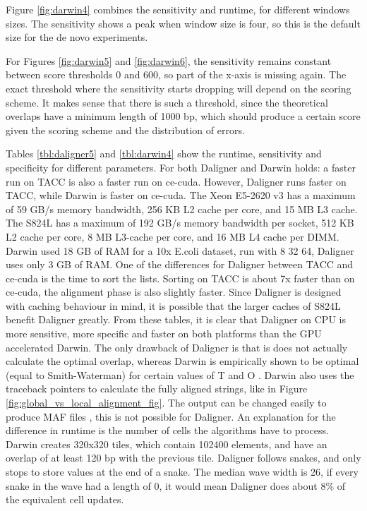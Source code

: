\documentclass[../thesis.tex]{subfiles}
\begin{document}
Figure \ref{fig:darwin4} combines the sensitivity and runtime, for different windows sizes.
The sensitivity shows a peak when window size is four, so this is the default size for the de novo experiments.

For Figures \ref{fig:darwin5} and \ref{fig:darwin6}, the sensitivity remains constant between score thresholds 0 and 600, so part of the x-axis is missing again.
The exact threshold where the sensitivity starts dropping will depend on the scoring scheme.
It makes sense that there is such a threshold, since the theoretical overlaps have a minimum length of 1000 bp, which should produce a certain score given the scoring scheme and the distribution of errors.

Tables \ref{tbl:daligner5} and \ref{tbl:darwin4} show the runtime, sensitivity and specificity for different parameters.
For both Daligner and Darwin holds: a faster run on TACC is also a faster run on ce-cuda.
However, Daligner runs faster on TACC, while Darwin is faster on ce-cuda.
The Xeon E5-2620 v3 has a maximum of 59 GB/s memory bandwidth, 256 KB L2 cache per core, and 15 MB L3 cache.
The S824L has a maximum of 192 GB/s memory bandwidth per socket, 512 KB L2 cache per core, 8 MB L3-cache per core, and 16 MB L4 cache per DIMM.
Darwin used 18 GB of RAM for a 10x E.coli dataset, run with 8 32 64, Daligner uses only 3 GB of RAM.
One of the differences for Daligner between TACC and ce-cuda is the time to sort the lists.
Sorting on TACC is about 7x faster than on ce-cuda, the alignment phase is also slightly faster.
Since Daligner is designed with caching behaviour in mind, it is possible that the larger caches of S824L benefit Daligner greatly.
From these tables, it is clear that Daligner on CPU is more sensitive, more specific and faster on both platforms than the GPU accelerated Darwin.
The only drawback of Daligner is that is does not actually calculate the optimal overlap, whereas Darwin is empirically shown to be optimal (equal to Smith-Waterman) for certain values of T and O \cite{Darwin2}.
Darwin also uses the traceback pointers to calculate the fully aligned strings, like in Figure \ref{fig:global_vs_local_alignment_fig}.
The output can be changed easily to produce MAF files \cite{MAF}, this is not possible for Daligner.
An explanation for the difference in runtime is the number of cells the algorithms have to process.
Darwin creates 320x320 tiles, which contain 102400 elements, and have an overlap of at least 120 bp with the previous tile.
Daligner follows snakes, and only stops to store values at the end of a snake.
The median wave width is 26, if every snake in the wave had a length of 0, it would mean Daligner does about 8\% of the equivalent cell updates.
\end{document}
